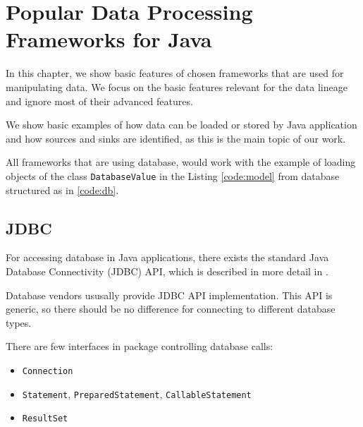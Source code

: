 \newcommand{\InsertCode}[2]{\begin{figure}[#1]\end{figure}}

\newcommand{\Code}[1]{\texttt{#1}}

\chapter{Popular Data Processing Frameworks for Java \label{frameworks}}

In this chapter, we show basic features of chosen frameworks
that are used for manipulating data.
We focus on the basic features relevant for the data lineage
and ignore most of their advanced features.

We show basic examples of how data can be loaded or stored by Java application
and how sources and sinks are identified, as this is the main topic of our work.

All frameworks that are using database, would work with the example
of loading objects of the class \Code{DatabaseValue} in the Listing \ref{code:model}
from database structured as in \ref{code:db}.

\InsertCode{h}{code/model}






\section{JDBC \label{frameworks:jdbc}}

For accessing database in Java applications, there exists the standard
Java Database Connectivity (JDBC) API, which is described
in more detail in \citet{JDBC_OVERVIEW}.

Database vendors ususally provide JDBC API implementation. This API is generic, so
there should be no difference for connecting to different database types.

There are few interfaces in \citet{java.sql} package controlling database calls:
\begin{itemize}
  \item \Code{Connection}
  \item \Code{Statement}, \Code{PreparedStatement}, \Code{CallableStatement}
  \item \Code{ResultSet}
\end{itemize}

